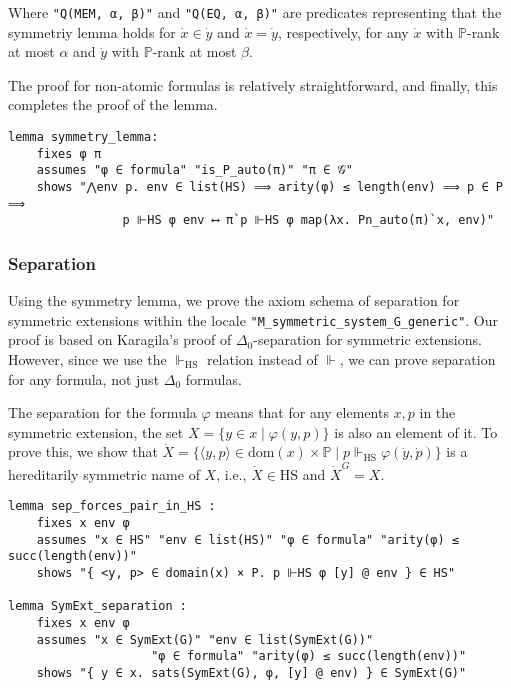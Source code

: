 \documentclass{report}
\newenvironment{isaframe}{\begin{mdframed}[topline=false, rightline=false, bottomline=false]}{\end{mdframed}}
\begin{document}
Where \texttt{"Q(MEM, α, β)"} and \texttt{"Q(EQ, α, β)"} are predicates 
representing that the symmetriy lemma holds for $\dot{x} \in \dot{y}$ and $\dot{x} = \dot{y}$, respectively,
for any $\dot{x}$ with $\mathbb{P}$-rank at most $\alpha$ and $\dot{y}$ with $\mathbb{P}$-rank at most $\beta$.

The proof for non-atomic formulas is relatively straightforward, and finally, 
this completes the proof of the lemma.

\begin{isaframe}
\begin{verbatim}
lemma symmetry_lemma:
    fixes φ π  
    assumes "φ ∈ formula" "is_P_auto(π)" "π ∈ 𝒢" 
    shows "⋀env p. env ∈ list(HS) ⟹ arity(φ) ≤ length(env) ⟹ p ∈ P ⟹ 
                p ⊩HS φ env ⟷ π`p ⊩HS φ map(λx. Pn_auto(π)`x, env)" 
\end{verbatim}
\end{isaframe}

\subsubsection{Separation}
Using the symmetry lemma, we prove the axiom schema of separation for symmetric extensions 
within the locale \texttt{"M\_symmetric\_system\_G\_generic"}.
Our proof is based on Karagila's proof \cite{karagila} of $\Delta_0$-separation for symmetric extensions.
However, since we use the $\Vdash_{\mathrm{HS}}$ relation instead of $\Vdash$,
we can prove separation for any formula, not just $\Delta_0$ formulas.

The separation for the formula $\varphi$ means that 
for any elements $x, p$ in the symmetric extension, the set $X = \{ y \in x \mid \varphi(y, p) \}$ is also an element of it.
To prove this, we show that 
$\dot{X} = \{ \langle y, p \rangle \in \mathrm{dom}(x) \times \mathbb{P} \mid p \Vdash_{\mathrm{HS}} \varphi(\dot{y}, \dot{p}) \}$ is a hereditarily symmetric name of $X$,
i.e., $\dot{X} \in \mathrm{HS}$ and $\dot{X}^G = X$.

\begin{isaframe}
\begin{verbatim}
lemma sep_forces_pair_in_HS : 
    fixes x env φ
    assumes "x ∈ HS" "env ∈ list(HS)" "φ ∈ formula" "arity(φ) ≤ succ(length(env))" 
    shows "{ <y, p> ∈ domain(x) × P. p ⊩HS φ [y] @ env } ∈ HS"

lemma SymExt_separation : 
    fixes x env φ 
    assumes "x ∈ SymExt(G)" "env ∈ list(SymExt(G))" 
                    "φ ∈ formula" "arity(φ) ≤ succ(length(env))" 
    shows "{ y ∈ x. sats(SymExt(G), φ, [y] @ env) } ∈ SymExt(G)"
\end{verbatim}
\end{isaframe}
\end{document}
